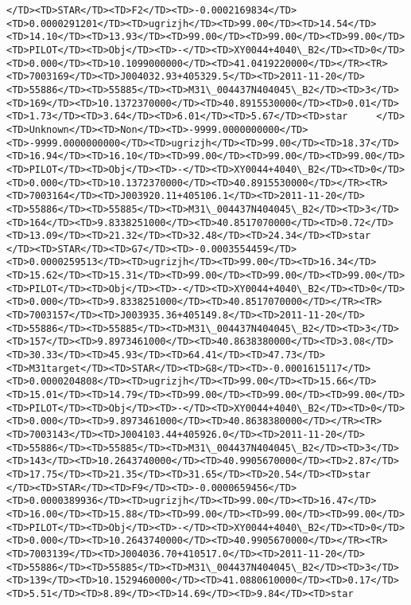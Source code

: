 \documentclass[11pt]{article}
\begin{document}
\begin{Verbatim}[commandchars=\\\{\}]
</TD><TD>STAR</TD><TD>F2</TD><TD>-0.0002169834</TD><TD>0.0000291201</TD><TD>ugrizjh</TD><TD>99.00</TD><TD>14.54</TD><TD>14.10</TD><TD>13.93</TD><TD>99.00</TD><TD>99.00</TD><TD>99.00</TD><TD>PILOT</TD><TD>Obj</TD><TD>-</TD><TD>XY0044+4040\_B2</TD><TD>0</TD><TD>0.000</TD><TD>10.1099000000</TD><TD>41.0419220000</TD></TR><TR><TD>7003169</TD><TD>J004032.93+405329.5</TD><TD>2011-11-20</TD><TD>55886</TD><TD>55885</TD><TD>M31\_004437N404045\_B2</TD><TD>3</TD><TD>169</TD><TD>10.1372370000</TD><TD>40.8915530000</TD><TD>0.01</TD><TD>1.73</TD><TD>3.64</TD><TD>6.01</TD><TD>5.67</TD><TD>star     </TD><TD>Unknown</TD><TD>Non</TD><TD>-9999.0000000000</TD><TD>-9999.0000000000</TD><TD>ugrizjh</TD><TD>99.00</TD><TD>18.37</TD><TD>16.94</TD><TD>16.10</TD><TD>99.00</TD><TD>99.00</TD><TD>99.00</TD><TD>PILOT</TD><TD>Obj</TD><TD>-</TD><TD>XY0044+4040\_B2</TD><TD>0</TD><TD>0.000</TD><TD>10.1372370000</TD><TD>40.8915530000</TD></TR><TR><TD>7003164</TD><TD>J003920.11+405106.1</TD><TD>2011-11-20</TD><TD>55886</TD><TD>55885</TD><TD>M31\_004437N404045\_B2</TD><TD>3</TD><TD>164</TD><TD>9.8338251000</TD><TD>40.8517070000</TD><TD>0.72</TD><TD>13.09</TD><TD>21.32</TD><TD>32.48</TD><TD>24.34</TD><TD>star     </TD><TD>STAR</TD><TD>G7</TD><TD>-0.0003554459</TD><TD>0.0000259513</TD><TD>ugrizjh</TD><TD>99.00</TD><TD>16.34</TD><TD>15.62</TD><TD>15.31</TD><TD>99.00</TD><TD>99.00</TD><TD>99.00</TD><TD>PILOT</TD><TD>Obj</TD><TD>-</TD><TD>XY0044+4040\_B2</TD><TD>0</TD><TD>0.000</TD><TD>9.8338251000</TD><TD>40.8517070000</TD></TR><TR><TD>7003157</TD><TD>J003935.36+405149.8</TD><TD>2011-11-20</TD><TD>55886</TD><TD>55885</TD><TD>M31\_004437N404045\_B2</TD><TD>3</TD><TD>157</TD><TD>9.8973461000</TD><TD>40.8638380000</TD><TD>3.08</TD><TD>30.33</TD><TD>45.93</TD><TD>64.41</TD><TD>47.73</TD><TD>M31target</TD><TD>STAR</TD><TD>G8</TD><TD>-0.0001615117</TD><TD>0.0000204808</TD><TD>ugrizjh</TD><TD>99.00</TD><TD>15.66</TD><TD>15.01</TD><TD>14.79</TD><TD>99.00</TD><TD>99.00</TD><TD>99.00</TD><TD>PILOT</TD><TD>Obj</TD><TD>-</TD><TD>XY0044+4040\_B2</TD><TD>0</TD><TD>0.000</TD><TD>9.8973461000</TD><TD>40.8638380000</TD></TR><TR><TD>7003143</TD><TD>J004103.44+405926.0</TD><TD>2011-11-20</TD><TD>55886</TD><TD>55885</TD><TD>M31\_004437N404045\_B2</TD><TD>3</TD><TD>143</TD><TD>10.2643740000</TD><TD>40.9905670000</TD><TD>2.87</TD><TD>17.75</TD><TD>21.35</TD><TD>31.65</TD><TD>20.54</TD><TD>star     </TD><TD>STAR</TD><TD>F9</TD><TD>-0.0000659456</TD><TD>0.0000389936</TD><TD>ugrizjh</TD><TD>99.00</TD><TD>16.47</TD><TD>16.00</TD><TD>15.88</TD><TD>99.00</TD><TD>99.00</TD><TD>99.00</TD><TD>PILOT</TD><TD>Obj</TD><TD>-</TD><TD>XY0044+4040\_B2</TD><TD>0</TD><TD>0.000</TD><TD>10.2643740000</TD><TD>40.9905670000</TD></TR><TR><TD>7003139</TD><TD>J004036.70+410517.0</TD><TD>2011-11-20</TD><TD>55886</TD><TD>55885</TD><TD>M31\_004437N404045\_B2</TD><TD>3</TD><TD>139</TD><TD>10.1529460000</TD><TD>41.0880610000</TD><TD>0.17</TD><TD>5.51</TD><TD>8.89</TD><TD>14.69</TD><TD>9.84</TD><TD>star     
\end{Verbatim}
\end{document}
